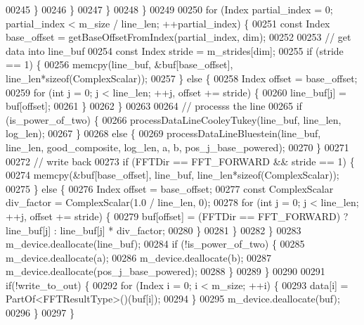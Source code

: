 \begin{DoxyCode}
00245             \}
00246           \}
00247         \}
00248       \}
00249 
00250       \textcolor{keywordflow}{for} (Index partial\_index = 0; partial\_index < m\_size / line\_len; ++partial\_index) \{
00251         \textcolor{keyword}{const} Index base\_offset = getBaseOffsetFromIndex(partial\_index, dim);
00252 
00253         \textcolor{comment}{// get data into line\_buf}
00254         \textcolor{keyword}{const} Index stride = m\_strides[dim];
00255         \textcolor{keywordflow}{if} (stride == 1) \{
00256           memcpy(line\_buf, &buf[base\_offset], line\_len*\textcolor{keyword}{sizeof}(ComplexScalar));
00257         \} \textcolor{keywordflow}{else} \{
00258           Index offset = base\_offset;
00259           \textcolor{keywordflow}{for} (\textcolor{keywordtype}{int} j = 0; j < line\_len; ++j, offset += stride) \{
00260             line\_buf[j] = buf[offset];
00261           \}
00262         \}
00263 
00264         \textcolor{comment}{// processs the line}
00265         \textcolor{keywordflow}{if} (is\_power\_of\_two) \{
00266           processDataLineCooleyTukey(line\_buf, line\_len, log\_len);
00267         \}
00268         \textcolor{keywordflow}{else} \{
00269           processDataLineBluestein(line\_buf, line\_len, good\_composite, log\_len, a, b, pos\_j\_base\_powered);
00270         \}
00271 
00272         \textcolor{comment}{// write back}
00273         \textcolor{keywordflow}{if} (FFTDir == FFT\_FORWARD && stride == 1) \{
00274           memcpy(&buf[base\_offset], line\_buf, line\_len*\textcolor{keyword}{sizeof}(ComplexScalar));
00275         \} \textcolor{keywordflow}{else} \{
00276           Index offset = base\_offset;
00277           \textcolor{keyword}{const} ComplexScalar div\_factor =  ComplexScalar(1.0 / line\_len, 0);
00278           \textcolor{keywordflow}{for} (\textcolor{keywordtype}{int} j = 0; j < line\_len; ++j, offset += stride) \{
00279              buf[offset] = (FFTDir == FFT\_FORWARD) ? line\_buf[j] : line\_buf[j] * div\_factor;
00280           \}
00281         \}
00282       \}
00283       m\_device.deallocate(line\_buf);
00284       \textcolor{keywordflow}{if} (!is\_power\_of\_two) \{
00285         m\_device.deallocate(a);
00286         m\_device.deallocate(b);
00287         m\_device.deallocate(pos\_j\_base\_powered);
00288       \}
00289     \}
00290 
00291     \textcolor{keywordflow}{if}(!write\_to\_out) \{
00292       \textcolor{keywordflow}{for} (Index i = 0; i < m\_size; ++i) \{
00293         data[i] = PartOf<FFTResultType>()(buf[i]);
00294       \}
00295       m\_device.deallocate(buf);
00296     \}
00297   \}

\end{DoxyCode}
